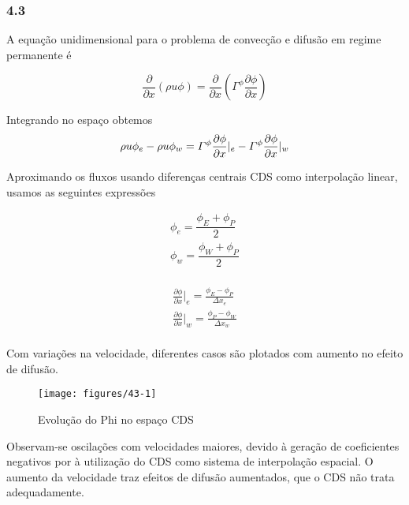 \documentclass[]{article}
\begin{document}
\subsubsection*{4.3}

A equação unidimensional para o problema de convecção e difusão em regime permanente é

\begin{equation}
	\frac{\partial}{\partial x} \left( \rho u \phi \right) = \frac{\partial}{\partial x} \left( \Gamma^\phi \frac{\partial \phi}{\partial x} \right)
\end{equation}

Integrando no espaço obtemos\\

\begin{equation}
	 \rho u \phi _e -  \rho u \phi_w =  \varGamma^\phi \frac{\partial \phi}{\partial x}\arrowvert_e - \varGamma^\phi \frac{\partial \phi}{\partial x}\arrowvert_w
\end{equation}


Aproximando os fluxos usando diferenças centrais CDS como interpolação linear, usamos as seguintes expressões

\begin{equation}
	\begin{aligned}
		\phi_{e} = \dfrac{\phi_{E} + \phi_{P}}{2} \\
		\phi_{w} = \dfrac{\phi_{W} + \phi_{P}}{2} \\
	\end{aligned}
\end{equation}

\begin{equation}
	\begin{aligned}
		\frac{\partial\phi}{\partial x}\bigg|_{e} = \frac{\phi_{E}-\phi_{P}}{\Delta x_{e}}\\
		\frac{\partial\phi}{\partial x}\bigg|_{w} = \frac{\phi_{P}-\phi_{W}}{\Delta x_{w}}\\
	\end{aligned}
\end{equation}

Com variações na velocidade, diferentes casos são plotados com aumento no efeito de difusão.

\begin{figure}[H]
	\centering
	\texttt{[image: figures/43-1]}
	\caption{Evolução do Phi no espaço CDS}
\end{figure}

Observam-se oscilações com velocidades maiores, devido à geração de coeficientes negativos por à utilização do CDS como sistema de interpolação espacial. O aumento da velocidade traz efeitos de difusão aumentados, que o CDS não trata adequadamente.\\
\end{document}
